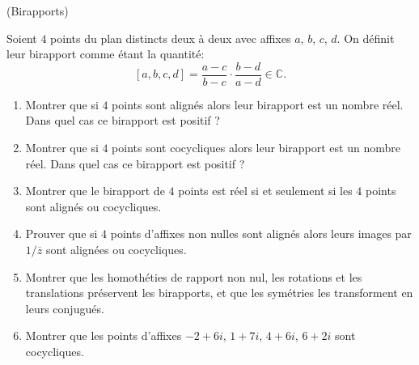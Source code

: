 \documentclass[a4paper,12pt,reqno]{amsart}
\begin{document}
\begin{exo} (Birapports)

  Soient $4$ points du plan distincts deux à deux avec affixes $a$, $b$, $c$, $d$. On définit leur birapport comme étant la quantité:
  $$
    [a,b,c,d]=\frac{a-c}{b-c}\cdot\frac{b-d}{a-d} \in \mathbb{C}.
  $$
  \begin{enumerate}
    \item Montrer que si $4$ points sont alignés alors leur birapport est un nombre réel. Dans quel cas ce birapport est positif ?
    \item Montrer que si $4$ points sont cocycliques alors leur birapport est un nombre réel. Dans quel cas ce birapport est positif ?
    \item Montrer que le birapport de $4$ points est réel si et seulement si les $4$ points sont alignés ou cocycliques.
    \item Prouver que si $4$ points d'affixes non nulles sont alignés alors leurs images par $1/\overline{z}$ sont alignées ou cocycliques.
    \item Montrer que les homothéties de rapport non nul, les rotations et les translations préservent les birapports, et que les symétries les transforment en leurs conjugués.
    \item Montrer que les points d'affixes $-2+6i$, $1+7i$, $4+6i$, $6+2i$ sont cocycliques.
  \end{enumerate}
\end{exo}
\end{document}
